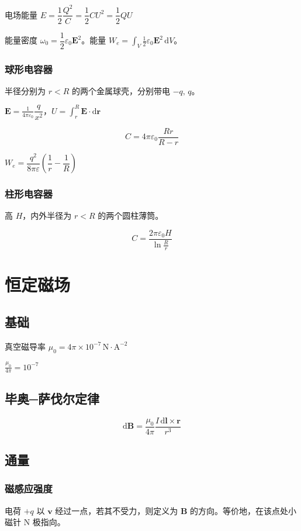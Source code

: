 \documentclass[12pt, a4paper, UTF8, openany]{ctexbook}
\newcommand{\dif}{\mathrm{d}}
\newcommand{\sdif}{\,\mathrm{d}}
\newcommand{\vect}[1]{\mathbf{#1}}
\newcommand{\vecr}{\vect{r}}
\newcommand{\vecv}{\vect{v}}
\newcommand{\vece}{\vect{E}}
\newcommand{\vecb}{\vect{B}}
\newcommand{\eps}{\varepsilon}
\newcommand{\conste}{\frac{1}{4 \pi \varepsilon_0}}
\newcommand{\constb}{\frac{\mu_0}{4 \pi}}
\newcommand{\unit}[1]{\mathrm{#1}}
\begin{document}
        电场能量 $E = \dfrac{1}{2} \dfrac{Q^2}{C} = \dfrac{1}{2} CU^2 = \dfrac{1}{2} QU$

        能量密度 $\omega_0 = \dfrac{1}{2} \varepsilon_0 \vece^2$。能量 $W_e = \int_{V} \frac{1}{2} \varepsilon_0 \vece^2 \sdif V$。

        \subsubsection{球形电容器}
        半径分别为 $r < R$ 的两个金属球壳，分别带电 $-q, \, q$。

        $\vece = \conste \dfrac{q}{x^2}$，$U = \int_{r}^{R} \vece \cdot \dif \vecr$

        $$C = 4 \pi \varepsilon_0 \dfrac{Rr}{R - r}$$

        $W_e = \dfrac{q^2}{8 \pi \eps} (\dfrac{1}{r} - \dfrac{1}{R})$

        \subsubsection{柱形电容器}
        高 $H$，内外半径为 $r < R$ 的两个圆柱薄筒。

        $$C = \frac{2 \pi \varepsilon_0 H}{\ln \frac{R}{r}}$$

    \section{恒定磁场}
        \subsection{基础}
        真空磁导率 $\mu_0 = 4 \pi \times 10^{-7} \,\unit{N \cdot A^{-2}}$

        $\constb = 10^{-7}$

        \subsection{毕奥─萨伐尔定律}
        $$\dif \vecb = \constb \frac{I \,\dif \vect{l} \times \vecr}{r^3}$$

        \subsection{通量}
        \subsubsection{磁感应强度}
        电荷 $+q$ 以 $\vecv$ 经过一点，若其不受力，则定义为 $\vecb$ 的方向。等价地，在该点处小磁针 N 极指向。
\end{document}
